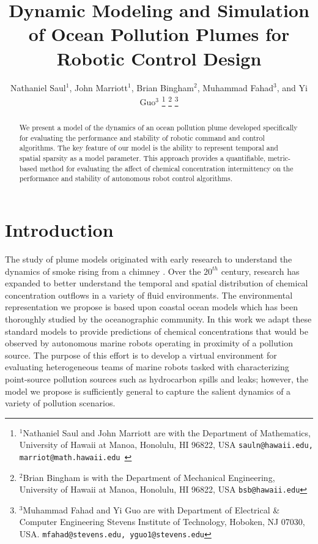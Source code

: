 \documentclass[ letterpaper, 10 pt, conference]{ieeeconf}  %
\title{\LARGE \bf
Dynamic Modeling and Simulation of Ocean Pollution Plumes for Robotic Control Design}
\author{Nathaniel Saul$^{1}$, John Marriott$^{1}$, Brian Bingham$^{2}$, Muhammad Fahad$^{3}$,  and Yi Guo$^{3}$ %
\thanks{$^{1}$Nathaniel Saul and John Marriott are with the Department of Mathematics, University of Hawaii at Manoa, Honolulu, HI 96822, USA {\tt\small sauln@hawaii.edu, marriot@math.hawaii.edu }}%
\thanks{$^{2}$Brian Bingham is with the Department of Mechanical Engineering, University of Hawaii at Manoa,
        Honolulu, HI 96822, USA {\tt\small bsb@hawaii.edu}}%
\thanks{$^{3}$Muhammad Fahad and Yi Guo are with Department of Electrical \& Computer Engineering Stevens Institute of Technology, Hoboken, NJ 07030, USA.  {\tt\small mfahad@stevens.edu, yguo1@stevens.edu}}%
}
\begin{document}
\maketitle
\thispagestyle{empty}
\pagestyle{empty}




\begin{abstract}

We present a model of the dynamics of an ocean pollution plume developed specifically for evaluating the performance and stability of robotic command and control algorithms. The key feature of our model is the ability to represent temporal and spatial sparsity as a model parameter.  This approach provides a quantifiable, metric-based method for evaluating the affect of chemical concentration intermittency on the performance and stability of autonomous robot control algorithms.

\end{abstract}



\section{Introduction}

The study of plume models originated with early research to understand the dynamics of smoke rising from a chimney \cite{Bosanquet1936}.  Over the $20^{th}$ century, research has expanded to better understand the temporal and spatial distribution of chemical concentration outflows in a variety of fluid environments. The environmental representation we propose is based upon coastal ocean models which has been thoroughly studied by the oceanographic community.  In this work we adapt these standard models to provide predictions of chemical concentrations that would be observed by autonomous marine robots operating in proximity of a pollution source.  The purpose of this effort is to develop a virtual environment for evaluating heterogeneous teams of marine robots tasked with characterizing point-source pollution sources such as hydrocarbon spills and leaks; however, the model we propose is sufficiently general to capture the salient dynamics of a variety of pollution scenarios.  
\end{document}
